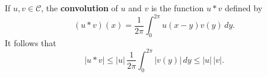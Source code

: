 If $u, v \in \mathcal{C}$, the \textbf{convolution} of $u$ and $v$ is the function $u * v$ defined by
$$(u * v)(x) = \frac{1}{2\pi} \int_{0}^{2\pi} u(x - y)v(y) \, dy.$$
It follows that
$$|u * v| \leq |u| \,\frac{1}{2\pi} \int_{0}^{2\pi} |v(y)| \, dy \leq |u|\,|v|.$$
